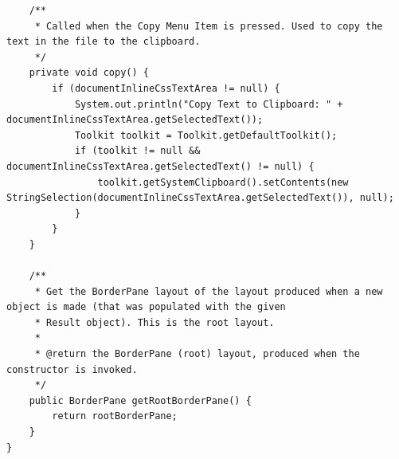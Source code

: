 \begin{lstlisting}
    /**
     * Called when the Copy Menu Item is pressed. Used to copy the text in the file to the clipboard.
     */
    private void copy() {
        if (documentInlineCssTextArea != null) {
            System.out.println("Copy Text to Clipboard: " + documentInlineCssTextArea.getSelectedText());
            Toolkit toolkit = Toolkit.getDefaultToolkit();
            if (toolkit != null && documentInlineCssTextArea.getSelectedText() != null) {
                toolkit.getSystemClipboard().setContents(new StringSelection(documentInlineCssTextArea.getSelectedText()), null);
            }
        }
    }

    /**
     * Get the BorderPane layout of the layout produced when a new object is made (that was populated with the given
     * Result object). This is the root layout.
     *
     * @return the BorderPane (root) layout, produced when the constructor is invoked.
     */
    public BorderPane getRootBorderPane() {
        return rootBorderPane;
    }
}
\end{lstlisting}
